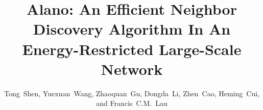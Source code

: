 \documentclass[conference]{IEEEtran}
\begin{document}
\title{Alano: An Efficient Neighbor Discovery Algorithm In An Energy-Restricted Large-Scale Network}


%
\author{Tong~Shen,
        Yuexuan~Wang,
        Zhaoquan~Gu,
        Dongda~Li,
        Zhen~Cao,
		Heming~Cui,
		and Francis~C.M.~Lau
}


\maketitle



\IEEEpeerreviewmaketitle

















\end{document}
